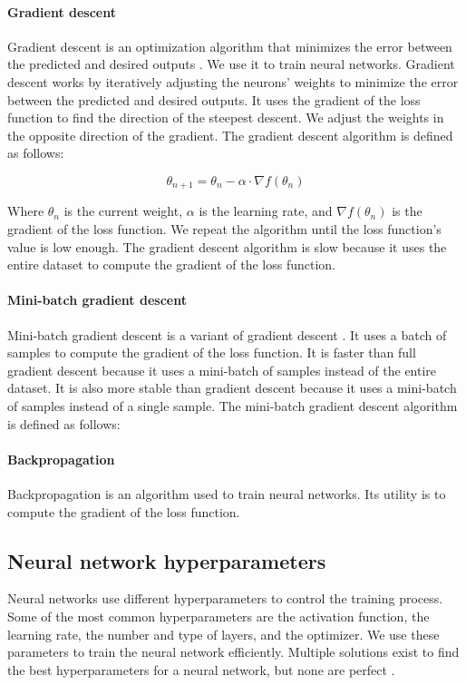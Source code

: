 \paragraph{Gradient descent}

Gradient descent is an optimization algorithm that minimizes the error between the predicted and desired outputs \cite{zhang2019gradient}. We use it to train neural networks. Gradient descent works by iteratively adjusting the neurons' weights to minimize the error between the predicted and desired outputs. It uses the gradient of the loss function to find the direction of the steepest descent. We adjust the weights in the opposite direction of the gradient. The gradient descent algorithm is defined as follows:

\begin{equation}
    \theta_{n+1} = \theta_{n} - \alpha \cdot \nabla f(\theta_{n})
\end{equation}

Where $\theta_{n}$ is the current weight, $\alpha$ is the learning rate, and $\nabla f(\theta_{n})$ is the gradient of the loss function. We repeat the algorithm until the loss function's value is low enough. The gradient descent algorithm is slow because it uses the entire dataset to compute the gradient of the loss function.

\paragraph{Mini-batch gradient descent}

Mini-batch gradient descent is a variant of gradient descent \cite{8264077}. It uses a batch of samples to compute the gradient of the loss function. It is faster than full gradient descent because it uses a mini-batch of samples instead of the entire dataset. It is also more stable than gradient descent because it uses a mini-batch of samples instead of a single sample. The mini-batch gradient descent algorithm is defined as follows:

\paragraph{Backpropagation}

Backpropagation is an algorithm used to train neural networks\cite{Sekhar}. Its utility is to compute the gradient of the loss function.

\subsection{Neural network hyperparameters}
Neural networks use different hyperparameters to control the training process. Some of the most common hyperparameters are the activation function, the learning rate, the number and type of layers, and the optimizer. We use these parameters to train the neural network efficiently. Multiple solutions exist to find the best hyperparameters for a neural network, but none are perfect \cite{yu2020hyperparameter}.

